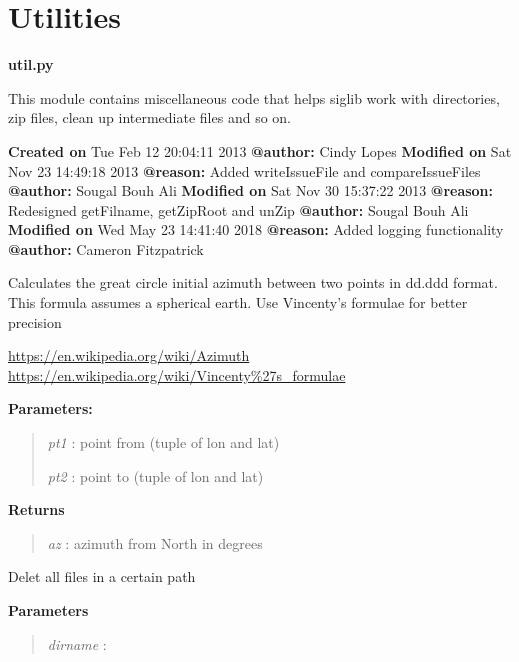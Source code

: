 \documentclass[letterpaper,10pt,openany,oneside]{sphinxmanual}
\begin{document}
\section{Utilities}
\label{code:module-Util}\label{code:utilities}
\textbf{util.py}

This module contains miscellaneous code that helps siglib work with directories, 
zip files, clean up intermediate files and so on.

\textbf{Created on} Tue Feb 12 20:04:11 2013 \textbf{@author:} Cindy Lopes
\textbf{Modified on} Sat Nov 23 14:49:18 2013 \textbf{@reason:} Added writeIssueFile and compareIssueFiles \textbf{@author:} Sougal Bouh Ali
\textbf{Modified on} Sat Nov 30 15:37:22 2013 \textbf{@reason:} Redesigned getFilname, getZipRoot and unZip \textbf{@author:} Sougal Bouh Ali
\textbf{Modified on} Wed May 23 14:41:40 2018 \textbf{@reason:} Added logging functionality \textbf{@author:} Cameron Fitzpatrick

\begin{fulllineitems}
\label{code:Util.az}
Calculates the great circle initial azimuth between two points
in dd.ddd format. 
This formula assumes a spherical earth.  Use Vincenty's formulae
for better precision

\href{https://en.wikipedia.org/wiki/Azimuth}{https://en.wikipedia.org/wiki/Azimuth}
\href{https://en.wikipedia.org/wiki/Vincenty\%27s\_formulae}{https://en.wikipedia.org/wiki/Vincenty\%27s\_formulae}

\textbf{Parameters:}
\begin{quote}

\emph{pt1} : point from (tuple of lon and lat)

\emph{pt2} : point to (tuple of lon and lat)
\end{quote}

\textbf{Returns}
\begin{quote}

\emph{az}  : azimuth from North in degrees
\end{quote}

\end{fulllineitems}


\begin{fulllineitems}
\label{code:Util.cleartree}
Delet all files in a certain path

\textbf{Parameters}
\begin{quote}

\emph{dirname} :
\end{quote}

\end{fulllineitems}
\end{document}
